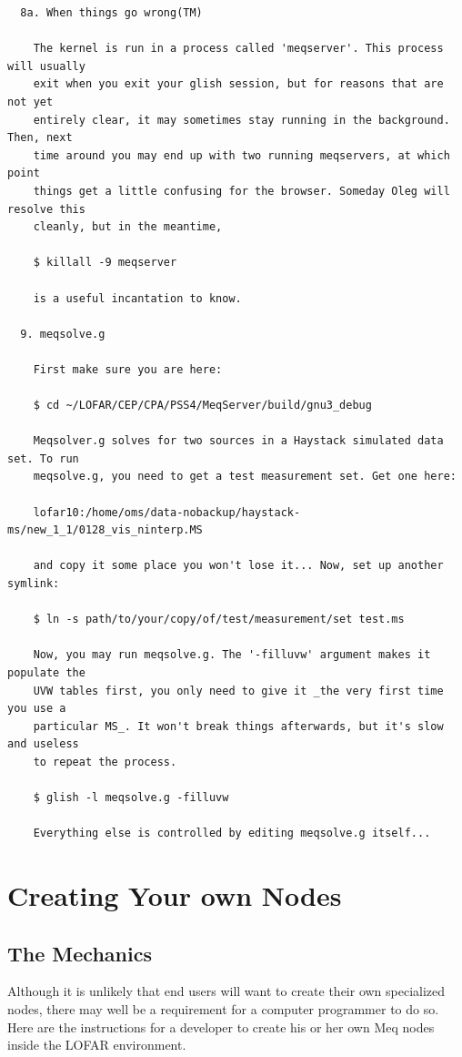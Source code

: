 \documentclass[10pt]{article}
\begin{document}
\begin{verbatim}
  8a. When things go wrong(TM)

    The kernel is run in a process called 'meqserver'. This process will usually
    exit when you exit your glish session, but for reasons that are not yet 
    entirely clear, it may sometimes stay running in the background. Then, next
    time around you may end up with two running meqservers, at which point
    things get a little confusing for the browser. Someday Oleg will resolve this
    cleanly, but in the meantime,

    $ killall -9 meqserver

    is a useful incantation to know.

  9. meqsolve.g

    First make sure you are here:

    $ cd ~/LOFAR/CEP/CPA/PSS4/MeqServer/build/gnu3_debug

    Meqsolver.g solves for two sources in a Haystack simulated data set. To run
    meqsolve.g, you need to get a test measurement set. Get one here:

    lofar10:/home/oms/data-nobackup/haystack-ms/new_1_1/0128_vis_ninterp.MS

    and copy it some place you won't lose it... Now, set up another symlink:

    $ ln -s path/to/your/copy/of/test/measurement/set test.ms

    Now, you may run meqsolve.g. The '-filluvw' argument makes it populate the
    UVW tables first, you only need to give it _the very first time you use a
    particular MS_. It won't break things afterwards, but it's slow and useless
    to repeat the process.

    $ glish -l meqsolve.g -filluvw

    Everything else is controlled by editing meqsolve.g itself...
\end{verbatim}
     
\section{Creating Your own Nodes }

\subsection{The Mechanics}

Although it is unlikely that end users will want to create their
own specialized nodes, there may well be a requirement for a computer 
programmer to do so. Here are the instructions for a developer
to create his or her own Meq nodes inside the LOFAR environment.
\end{document}
